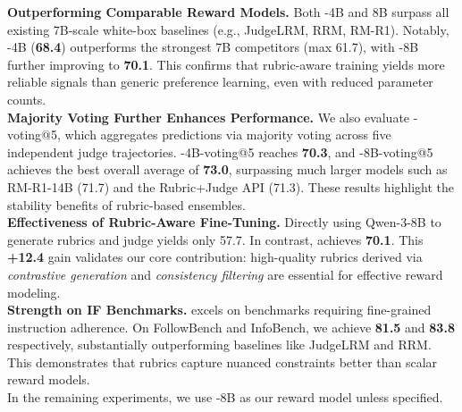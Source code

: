 \noindent \textbf{Outperforming Comparable Reward Models.} 
Both {\name}-4B and 8B surpass all existing 7B-scale white-box baselines (e.g., JudgeLRM, RRM, RM-R1). Notably, {\name}-4B (\textbf{68.4}) outperforms the strongest 7B competitors (max 61.7), with {\name}-8B further improving to \textbf{70.1}. This confirms that rubric-aware training yields more reliable signals than generic preference learning, even with reduced parameter counts. \\
\noindent \textbf{Majority Voting Further Enhances Performance.} 
We also evaluate {\name}-voting@5, which aggregates predictions via majority voting across five independent judge trajectories.
{\name}-4B-voting@5 reaches \textbf{70.3}, and {\name}-8B-voting@5 achieves the best overall average of \textbf{73.0}, surpassing much larger models such as RM-R1-14B (71.7) and the Rubric+Judge API (71.3).
These results highlight the stability benefits of rubric-based ensembles. \\
\noindent \textbf{Effectiveness of Rubric-Aware Fine-Tuning.} 
Directly using Qwen-3-8B to generate rubrics and judge yields only 57.7. In contrast, {\name} achieves \textbf{70.1}. This \textbf{+12.4} gain validates our core contribution: high-quality rubrics derived via \textit{contrastive generation} and \textit{consistency filtering} are essential for effective reward modeling. \\
\noindent \textbf{Strength on IF Benchmarks.}
{\name} excels on benchmarks requiring fine-grained instruction adherence. On FollowBench and InfoBench, we achieve \textbf{81.5} and \textbf{83.8} respectively, substantially outperforming baselines like JudgeLRM and RRM. This demonstrates that rubrics capture nuanced constraints better than scalar reward models. \\
In the remaining experiments, we use {\name-8B} as our reward model unless specified. 


